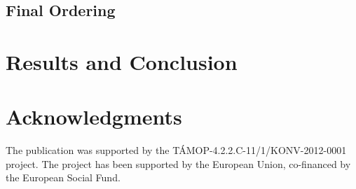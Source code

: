 \documentclass{acm_proc_article-me}
\begin{document}
\subsection{Final Ordering}

\section{Results and Conclusion}




\section{Acknowledgments}

The publication was supported by the T\'AMOP-4.2.2.C-11/1/KONV-2012-0001 project. The project has been supported by the European Union, co-financed by the European Social Fund.



\end{document}

